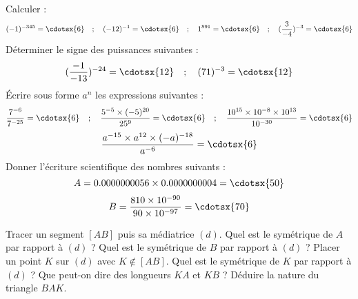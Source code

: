 \documentclass[a4paper,addpoints,12pt]{exam}
\begin{document}
\devoir[prv=false,ds=true,num=2 ,niv=2 , date=19/12/2022]

\begin{exo}[12]
\begin{questions}
\question[4] Calculer : 
\[
 (-1)^{-345}=\cdotsx{6} \quad; \quad (-12)^{-1}=\cdotsx{6} \quad; \quad 1^{891}=\cdotsx{6} \quad; \quad (\dfrac{3}{-4})^{-3}=\cdotsx{6}
\]
\question[2] Déterminer le signe des puissances suivantes :
\[ (\dfrac{-1}{-13})^{-24}=\cdotsx{12} \quad; \quad 
	(71)^{-3}=\cdotsx{12}
\] 
\question[4] Écrire sous forme $a^{n}$ les expressions suivantes :
\[\dfrac{7^{-6}}{7^{-25}}=\cdotsx{6}\quad; \quad
	\dfrac{5^{-5}\times (-5)^{20}}{25^{9}}=\cdotsx{6}\quad; \quad
	\dfrac{10^{15}\times 10^{-8}\times 10^{13}}{10^{-30}}=\cdotsx{6}
\]
\[
\dfrac{a^{-15}\times a^{12}\times (-a)^{-18}}{a^{-6}}=\cdotsx{6}
\]
\question[2] Donner l'écriture scientifique des nombres suivants :
\[
	A=0.0000000056\times 0.0000000004=\cdotsx{50} 
\]
\[	
	B=\dfrac{810\times 10^{-90}}{90\times 10^{-97}}=\cdotsx{70}
\]
\end{questions}
\end{exo}

\begin{exo}[8]
\begin{questions}
\question Tracer un segment $[AB]$ puis sa médiatrice $(d)$.
\question Quel est le symétrique de $A$ par rapport à $(d)$ ?
\question Quel est le symétrique de $B$ par rapport à $(d)$ ?
\question Placer un point $K$ sur $(d)$ avec $K\notin [AB]$.
\question Quel est le symétrique de $K$ par rapport à $(d)$ ?
\question Que peut-on dire des longueurs $KA$ et $KB$ ?
\question Déduire la nature du triangle $BAK$.
\end{questions}
\end{exo}
\end{document}
